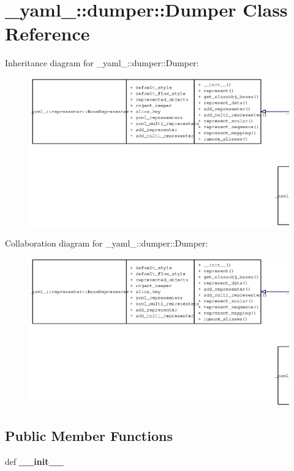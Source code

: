 \section{\_\-yaml\_\-::dumper::Dumper Class Reference}
\label{class__yaml___1_1dumper_1_1Dumper}
Inheritance diagram for \_\-yaml\_\-::dumper::Dumper:\nopagebreak
\begin{figure}[H]
\begin{center}
\leavevmode
\includegraphics[width=400pt]{class__yaml___1_1dumper_1_1Dumper__inherit__graph}
\end{center}
\end{figure}
Collaboration diagram for \_\-yaml\_\-::dumper::Dumper:\nopagebreak
\begin{figure}[H]
\begin{center}
\leavevmode
\includegraphics[width=400pt]{class__yaml___1_1dumper_1_1Dumper__coll__graph}
\end{center}
\end{figure}
\subsection*{Public Member Functions}
\begin{CompactItemize}
\item 
def {\bf \_\-\_\-init\_\-\_\-}
\end{CompactItemize}



